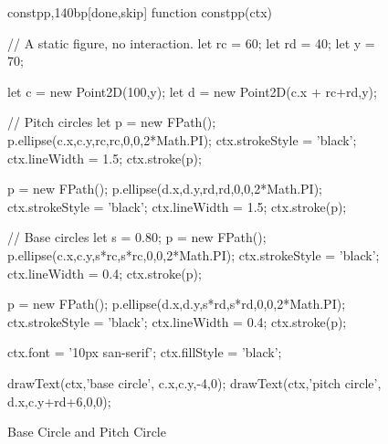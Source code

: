 \documentclass[10pt]{article}
\begin{document}
\begin{figure}
\begin{figput}{constpp,140bp}[done,skip]
function constpp(ctx) {

  // A static figure, no interaction.
  let rc = 60;
  let rd = 40;
  let y = 70;
  
  let c = new Point2D(100,y);
  let d = new Point2D(c.x + rc+rd,y);

  // Pitch circles
  let p = new FPath();
  p.ellipse(c.x,c.y,rc,rc,0,0,2*Math.PI);
  ctx.strokeStyle = 'black';
  ctx.lineWidth = 1.5;
  ctx.stroke(p);

  p = new FPath();
  p.ellipse(d.x,d.y,rd,rd,0,0,2*Math.PI);
  ctx.strokeStyle = 'black';
  ctx.lineWidth = 1.5;
  ctx.stroke(p);

  // Base circles
  let s = 0.80;
  p = new FPath();
  p.ellipse(c.x,c.y,s*rc,s*rc,0,0,2*Math.PI);
  ctx.strokeStyle = 'black';
  ctx.lineWidth = 0.4;
  ctx.stroke(p);

  p = new FPath();
  p.ellipse(d.x,d.y,s*rd,s*rd,0,0,2*Math.PI);
  ctx.strokeStyle = 'black';
  ctx.lineWidth = 0.4;
  ctx.stroke(p);

  ctx.font = '10px san-serif';
  ctx.fillStyle = 'black';
  
  drawText(ctx,'base circle', c.x,c.y,-4,0);
  drawText(ctx,'pitch circle', d.x,c.y+rd+6,0,0);
}
\end{figput}
\caption{Base Circle and Pitch Circle}
\label{fig-constant-pp}
\end{figure}
\end{document}
